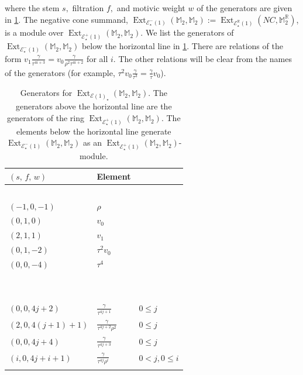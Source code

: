 \documentclass[10pt,a4paper]{amsart}
\DeclareMathOperator{\Ext}{Ext}
\newcommand{\cE}{{\mathcal E}}
\newcommand{\mM}{{\mathbb M}}
\newcommand{\mR}{{\mathbb R}}
\begin{document}
where the stem $s,$ filtration $f,$ and motivic weight $w$ of the generators are given in \cref{tab:ExtM2M2gens}. The negative cone summand, $\Ext_{\cE_\star^{-} (1)} (\mM_2, \mM_2):= \Ext_{\cE_{\star}^{\mR} (1)} (NC, \mM_2^{\mR})$, is a module over $\Ext_{\cE_\star^{+} (1)} (\mM_2, \mM_2)$. We list the generators of $\Ext_{\cE_\star^{-} (1)} (\mM_2, \mM_2)$ below the horizontal line in \cref{tab:ExtM2M2gens}.  There are relations of the form $v_{1}\frac{\gamma}{\tau^{4i + 3}} = v_{0}\frac{\gamma}{\rho^{2}\tau^{4i + 2}}$ for all $i$. The other relations will be clear from the names of the generators (for example, $\tau^{2}v_{0}\frac{\gamma}{\tau^{3}} = \frac{\gamma}{\tau} v_{0}$).
\begin{table}[ht]
    \centering
    \begin{tabular}{l l l}
          $(s,\, f,\, w)$ & Element & \\
            \hline
             $\,$ & $\,$ \\
             $(-1, 0, -1)$ & $\rho$ \\
             $(0, 1, 0)$ & $v_0$ \\
            $(2, 1, 1)$ & $v_1$ \\
            $(0, 1, -2)$ & $\tau^2 v_0$ \\
            $(0, 0, -4)$ & $\tau^4$ \\
           $\,$ & $\,$ \\
           \hline
           \, & \, \\
           $(0,0, 4j+2)$ & $\frac{\gamma}
           {\tau^{4j + 1}}$ & $0 \le j$\\
           $\left(2,0,4(j+1) + 1\right)$ & $\frac{\gamma}
           {\tau^{4j + 2}\rho^{2}}$ & $0 \le j$ \\
           $(0,0,4j + 4)$ & $\frac{\gamma}
           {\tau^{4j + 3}}$ & $0 \le j$ \\
           $(i,0,  4j  + i + 1)$ & $\frac{\gamma}
           {\tau^{4j}\rho^{i}}$ & $0 < j, 0 \le i$ \\
           \label{ExtM2gens}
    \end{tabular}
    \caption{Generators for $\Ext_{\cE (1)_\star} (\mM_2, \mM_2)$. The generators above the horizontal line are the generators of the ring $\Ext_{\cE^{+}_\star (1)} (\mM_2, \mM_2)$. The elements below the horizontal line generate $\Ext_{\cE^{-}_\star (1)} (\mM_2, \mM_2)$ as an $\Ext_{\cE^{+}_\star (1)} (\mM_2, \mM_2)$-module.}
    \label{tab:ExtM2M2gens}
\end{table}
\end{document}
